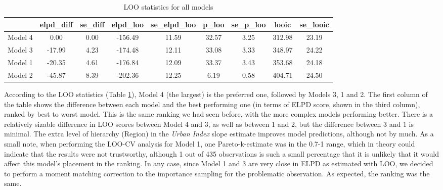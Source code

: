 \documentclass[12pt]{article}
\begin{document}
\begin{table}[ht]
	\centering
	\begin{tabular}{rcccccccc}
		\hline
		& elpd\_diff & se\_diff & elpd\_loo & se\_elpd\_loo & p\_loo & se\_p\_loo & looic & se\_looic \\ 
		\hline
		Model 4 & 0.00 & 0.00 & -156.49 & 11.59 & 32.57 & 3.25 & 312.98 & 23.19 \\ 
		Model 3 & -17.99 & 4.23 & -174.48 & 12.11 & 33.08 & 3.33 & 348.97 & 24.22 \\ 
		Model 1 & -20.35 & 4.61 & -176.84 & 12.09 & 33.37 & 3.43 & 353.68 & 24.18 \\ 
		Model 2 & -45.87 & 8.39 & -202.36 & 12.25 & 6.19 & 0.58 & 404.71 & 24.50 \\ 
		\hline
	\end{tabular}
	\caption{LOO statistics for all models}
	\label{tab:loo}
\end{table}

According to the LOO statistics (Table \ref{tab:loo}), Model 4 (the largest) is the preferred one, followed by Models 3, 1 and 2. The first column of the table shows the difference between each model and the best performing one (in terms of ELPD score, shown in the third column), ranked by best to worst model.
This is the same ranking we had seen before, with the more complex models performing better. There is a relatively sizable difference in LOO scores between Model 4 and 3, as well as between 1 and 2, but the difference between 3 and 1 is minimal. The extra level of hierarchy (Region) in the \textit{Urban Index} slope estimate improves model predictions, although not by much.
As a small note, when performing the LOO-CV analysis for Model 1, one Pareto-k-estimate was in the 0.7-1 range, which in theory could indicate that the results were not trustworthy, although 1 out of 435 observations is such a small percentage that it is unlikely that it would affect this model's placement in the ranking. In any case, since Model 1 and 3 are very close in ELPD as estimated with LOO, we decided to perform a moment matching correction to the importance sampling for the problematic observation. As expected, the ranking was the same.


\end{document}
